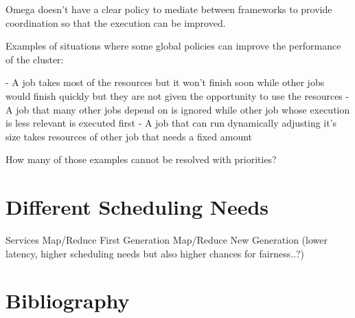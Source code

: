 \documentclass{svjour3}                     %
\begin{document}
Omega doesn't have a clear policy to mediate between frameworks to provide coordination so 
that the execution can be improved.

Examples of situations where some global policies can improve the performance of the cluster:

 - A job takes most of the resources but it won't finish soon while other jobs would finish
   quickly but they are not given the opportunity to use the resources
 - A job that many other jobs depend on is ignored while other job whose execution is less
   relevant is executed first
 - A job that can run dynamically adjusting it's size takes resources of other job that needs
  a fixed amount

How many of those examples cannot be resolved with priorities? 

\section{Different Scheduling Needs}

Services
Map/Reduce First Generation
Map/Reduce New Generation (lower latency, higher scheduling needs but also higher
chances for fairness..?)


\section{Bibliography}


\printbibliography
\end{document}
